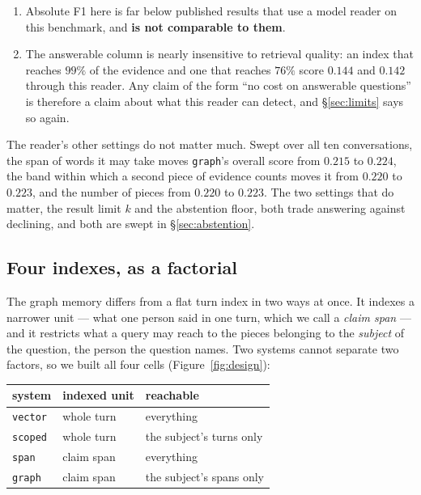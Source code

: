 \documentclass[11pt]{article}
\newcommand{\arm}[1]{\texttt{#1}}
\begin{document}
\begin{enumerate}[leftmargin=1.4em,itemsep=2pt]
\item Absolute F1 here is far below published results that use a model reader
      on this benchmark, and \textbf{is not comparable to them}.
\item The answerable column is nearly insensitive to retrieval quality: an
      index that reaches $99\%$ of the evidence and one that reaches $76\%$
      score $0.144$ and $0.142$ through this reader. Any claim of the form
      ``no cost on answerable questions'' is therefore a claim about what this
      reader can detect, and \S\ref{sec:limits} says so again.
\end{enumerate}

The reader's other settings do not matter much. Swept over all ten
conversations, the span of words it may take moves \arm{graph}'s overall
score from $0.215$ to $0.224$, the band within which a second piece of evidence
counts moves it from $0.220$ to $0.223$, and the number of pieces from $0.220$
to $0.223$. The two settings that do matter, the result limit $k$ and the
abstention floor, both trade answering against declining, and both are swept in
\S\ref{sec:abstention}.

\subsection{Four indexes, as a factorial}
\label{sec:indexes}

The graph memory differs from a flat turn index in two ways at once. It indexes
a narrower unit --- what one person said in one turn, which we call a
\emph{claim span} --- and it restricts what a query may reach to the pieces
belonging to the \emph{subject} of the question, the person the question names.
Two systems cannot separate two factors, so we built all four cells
(Figure~\ref{fig:design}):

\begin{center}
\small
\begin{tabular}{@{}lll@{}}
\toprule
system & indexed unit & reachable \\
\midrule
\arm{vector} & whole turn & everything \\
\arm{scoped} & whole turn & the subject's turns only \\
\arm{span}   & claim span & everything \\
\arm{graph}  & claim span & the subject's spans only \\
\bottomrule
\end{tabular}
\end{center}
\end{document}
